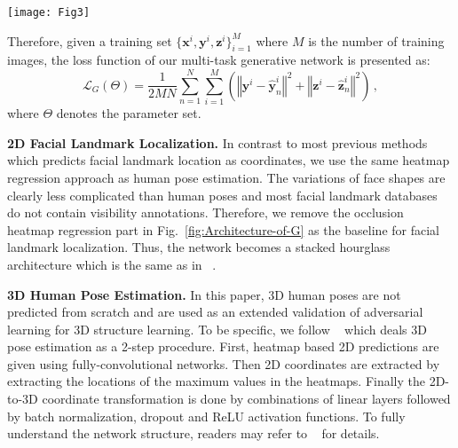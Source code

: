 \documentclass[10pt,journal,compsoc]{IEEEtran}
\begin{document}
\begin{figure*}[!t]
\centering
\texttt{[image: Fig3]}
%
\caption{Architecture of the multi-task generative network \textit{G}. Black, orange, blue and red rectangles indicate convolutional layers, residual blocks, max pooling layers and hourglass blocks respectively.  $\oplus$ indicates  addition of input features. Solid blue and green circles indicate pose and occlusion losses in the network. The brief architecture of the hourglass block is shown at the right. Stacking of the first and the second networks is displayed and more networks can be stacked with the same structure.}
\label{fig:Architecture-of-G}
\end{figure*}



Therefore, given a training set $\{\bm{x}^{i},\bm{y}^{i},\bm{z}^{i}\}_{i=1}^{M}$ where $M$ is the number of training images, the loss function of our multi-task generative network is presented as:
\begin{equation}
\label{eq:multitaskG}
\mathcal{L}_{G}(\Theta)=\frac{1}{2MN}\sum_{n=1}^{N}\sum_{i=1}^{M}\left(\left\Vert \bm{y}^{i}-\hat{\bm{y}}_{n}^{i}\right\Vert ^{2}+\left\Vert \bm{z}^{i}-\hat{\bm{z}}_{n}^{i}\right\Vert ^{2}\right) \,,
\end{equation}
where $\Theta$ denotes the parameter set.




\noindent \textbf{2D  Facial Landmark Localization.}
In contrast to most previous methods which predicts facial landmark location as coordinates, we use the same heatmap regression approach as human pose estimation.
The variations of face shapes are clearly less complicated than human poses and most facial landmark databases do not
contain visibility annotations.
Therefore, we remove the occlusion heatmap regression part in Fig.~\ref{fig:Architecture-of-G} as the baseline for facial landmark localization.
Thus, the network becomes a stacked hourglass architecture which is the same as in ~\cite{conf/eccv/NewellYD16}.






\noindent \textbf{3D   Human   Pose Estimation.}
In this paper, 3D human poses are not predicted from scratch and are used as an extended validation of adversarial learning for 3D structure learning.
To be specific, we follow ~\cite{martinez2017simple} which deals 3D pose estimation as a 2-step procedure.
First, heatmap based 2D predictions are given using fully-convolutional networks.
Then 2D coordinates are extracted by extracting the locations of the maximum values in the heatmaps.
Finally the 2D-to-3D coordinate transformation is done by combinations of linear layers followed by batch normalization, dropout and ReLU activation functions.
To fully understand the network structure, readers may refer to ~\cite{martinez2017simple} for details.
\end{document}
